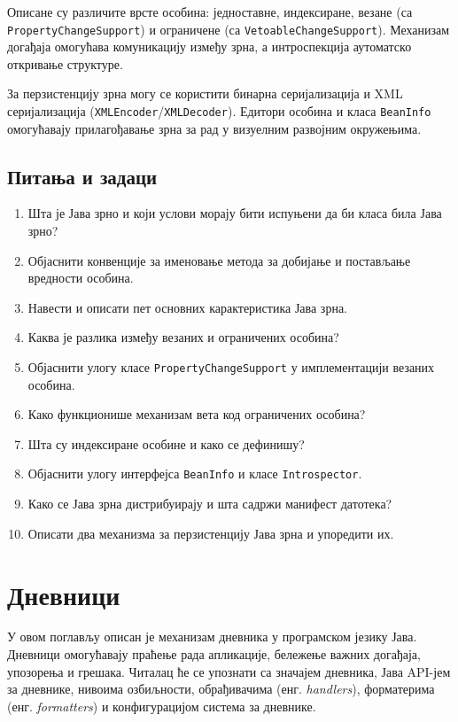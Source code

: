 Описане су различите врсте особина: једноставне, индексиране, везане (са \texttt{PropertyChangeSupport}) и ограничене (са \texttt{VetoableChangeSupport}). Механизам догађаја омогућава комуникацију између зрна, а интроспекција аутоматско откривање структуре.

За перзистенцију зрна могу се користити бинарна серијализација и XML серијализација (\texttt{XMLEncoder}/\texttt{XMLDecoder}). Едитори особина и класа \texttt{BeanInfo} омогућавају прилагођавање зрна за рад у визуелним развојним окружењима.


\section{Питања и задаци}

\begin{enumerate}
\item Шта је Јава зрно и који услови морају бити испуњени да би класа била Јава зрно?
\item Објаснити конвенције за именовање метода за добијање и постављање вредности особина.
\item Навести и описати пет основних карактеристика Јава зрна.
\item Каква је разлика између везаних и ограничених особина?
\item Објаснити улогу класе \texttt{PropertyChangeSupport} у имплементацији везаних особина.
\item Како функционише механизам вета код ограничених особина?
\item Шта су индексиране особине и како се дефинишу?
\item Објаснити улогу интерфејса \texttt{BeanInfo} и класе \texttt{Introspector}.
\item Како се Јава зрна дистрибуирају и шта садржи манифест датотека?
\item Описати два механизма за перзистенцију Јава зрна и упоредити их.
\end{enumerate}



\setlength{\parindent}{15pt}
\setlength{\parskip}{0pt}
\chapter{Дневници}

У овом поглављу описан је механизам дневника у програмском језику Јава. Дневници омогућавају праћење рада апликације, бележење важних догађаја, упозорења и грешака. Читалац ће се упознати са значајем дневника, Јава API-јем за дневнике, нивоима озбиљности, обрађивачима (енг. \textit{handlers}), форматерима (енг. \textit{formatters}) и конфигурацијом система за дневнике.


